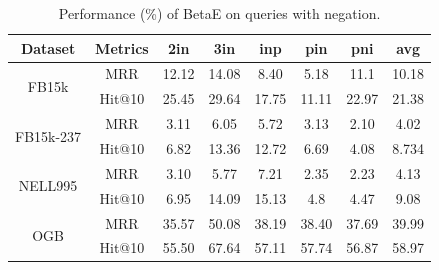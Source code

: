 \begin{table}[h!]
\centering
\caption{Performance (\%) of BetaE on queries with negation. 
}
\begin{tabular}{cccccccc}
	\toprule
	Dataset & Metrics & 2in & 3in & inp & pin & pni & avg \\
	\hline
	\multirow{2}{*}{FB15k} & MRR & 12.12 & 14.08 & 8.40 & 5.18 & 11.1 & 10.18 \\
		& Hit@10 & 25.45 & 29.64 & 17.75 & 11.11 & 22.97 & 21.38 \\
	\hline
	\multirow{2}{*}{FB15k-237} & MRR & 3.11 & 6.05 & 5.72 & 3.13 & 2.10 & 4.02 \\
		& Hit@10 & 6.82 & 13.36 & 12.72 & 6.69 & 4.08 & 8.734 \\
	\hline
	\multirow{2}{*}{NELL995} & MRR & 3.10 & 5.77 & 7.21 & 2.35 & 2.23 & 4.13 \\
		& Hit@10 & 6.95 & 14.09 & 15.13 & 4.8 & 4.47 & 9.08 \\
	\hline
	\multirow{2}{*}{OGB} & MRR & 35.57 & 50.08 & 38.19 & 38.40 & 37.69 & 39.99 \\
		& Hit@10 & 55.50 & 67.64 & 57.11 & 57.74 & 56.87 & 58.97 \\								
	\bottomrule
\end{tabular}
\end{table}

